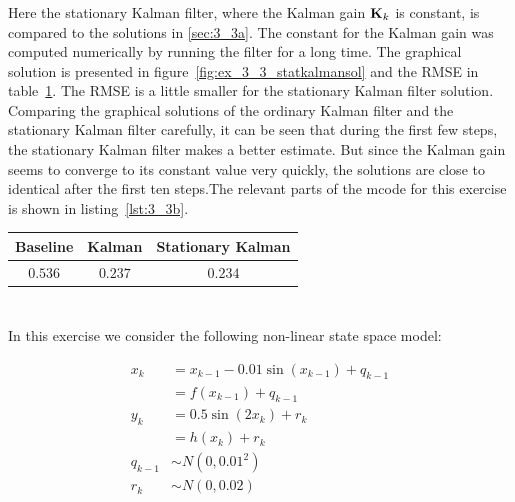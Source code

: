 \documentclass[a4paper,oneside,article]{memoir}
\newcommand{\otoprule}{\midrule[\heavyrulewidth]}
\begin{document}



\subsubsection{\label{sec:3_3b}}

Here the stationary Kalman filter, where the Kalman gain $\mathbf{K}_k$ is constant,
is compared to the solutions in \ref{sec:3_3a}. The constant for the Kalman gain
was computed numerically by running the filter for a long time. The graphical
solution is presented in figure~\ref{fig:ex_3_3_statkalmansol} and the RMSE in
table~\ref{table:rmse3_3a}. The RMSE is a little smaller for the stationary
Kalman filter solution. Comparing the graphical solutions of the
ordinary Kalman filter and the stationary Kalman filter carefully, it can be
seen that during the first few steps, the stationary Kalman filter makes a
better estimate. But since the Kalman gain seems to converge to its constant
value very quickly, the solutions are close to identical after the first ten
steps.The relevant
parts of the mcode for this exercise is shown in listing~\ref{lst:3_3b}.





\begin{table}[h]
	\centering
	\begin{tabular}{c c c}
		\otoprule
		Baseline & Kalman & Stationary Kalman\\
		\midrule
		$0.536$ & $0.237$ & $0.234$\\
		\bottomrule
	\end{tabular}
	\label{table:rmse3_3a}
\end{table}

\section{}
\subsection{}\label{sec:4_1}
In this exercise we consider the following non-linear state space model:

\begin{align}
	x_k&=x_{k-1}-0.01\sin(x_{k-1})+q_{k-1}\\
	&=f(x_{k-1})+q_{k-1}\\
	y_k&=0.5\sin(2x_k)+r_k\\
	&=h(x_{k})+r_{k}\\
	q_{k-1} &\sim N\left(0,0.01^2\right)\\
	r_{k} &\sim N\left(0,0.02 \right)
\end{align}
\end{document}
